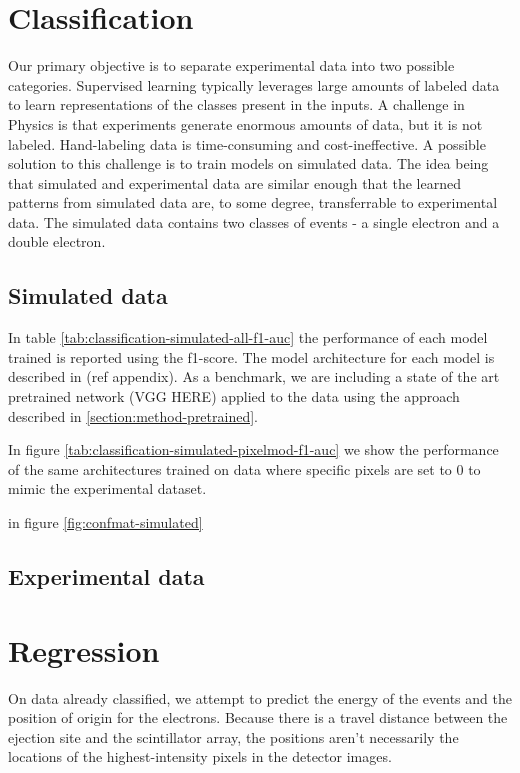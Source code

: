 \section{Classification}
Our primary objective is to separate experimental data into two possible categories.
Supervised learning typically leverages large amounts of labeled data to learn
representations of the classes present in the inputs. A challenge in Physics is that
experiments generate enormous amounts of data, but it is not labeled. Hand-labeling
data is time-consuming and cost-ineffective. A possible solution to this challenge
is to train models on simulated data. The idea being that simulated and experimental
data are similar enough that the learned patterns from simulated data are, to some degree,
transferrable to experimental data.
The simulated data contains two classes of events - a single electron and a double electron.

\subsection{Simulated data}
In table \ref{tab:classification-simulated-all-f1-auc} the performance of each model 
trained is reported using the f1-score. The model architecture for each model is described in (ref appendix).
As a benchmark, we are including a state of the art pretrained network (\cite{}VGG HERE) applied to the data 
using the approach described in \ref{section:method-pretrained}.

In figure \ref{tab:classification-simulated-pixelmod-f1-auc} we show the performance
of the same architectures trained on data where specific pixels are set to 0 to mimic
the experimental dataset.

in figure \ref{fig:confmat-simulated}

\subsection{Experimental data}

\section{Regression}
On data already classified, we attempt to predict the energy of the events and the position of origin for
the electrons. Because there is a travel distance between the ejection site and the scintillator array,
the positions aren't necessarily the locations of the highest-intensity pixels in the detector images.
